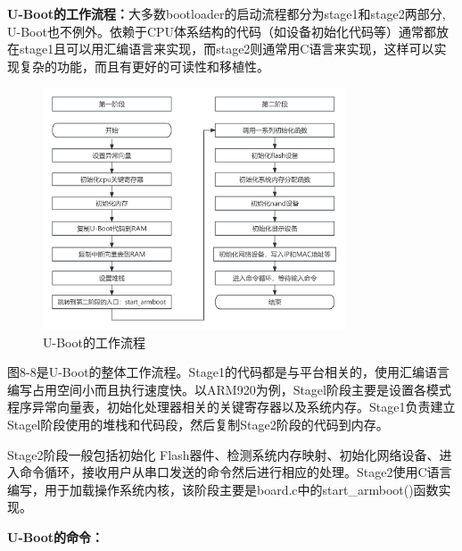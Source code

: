     \textbf{  U-Boot的工作流程：}大多数bootloader的启动流程都分为stage1和stage2两部分, U-Boot也不例外。依赖于CPU体系结构的代码（如设备初始化代码等）通常都放在stage1且可以用汇编语言来实现，而stage2则通常用C语言来实现，这样可以实现复杂的功能，而且有更好的可读性和移植性。
    
    \begin{figure}[h]
    	\centering
    	\includegraphics[width=0.8\textwidth]{figures/08-01-U-Boot的工作流程.png}
    	\caption{U-Boot的工作流程}
    	\label{U-Boot的工作流程}
    \end{figure}
    
    图8-8是U-Boot的整体工作流程。Stage1的代码都是与平台相关的，使用汇编语言编写占用空间小而且执行速度快。以ARM920为例，Stagel阶段主要是设置各模式程序异常向量表，初始化处理器相关的关键寄存器以及系统内存。Stage1负责建立Stagel阶段使用的堆栈和代码段，然后复制Stage2阶段的代码到内存。
    
    Stage2阶段一般包括初始化 Flash器件、检测系统内存映射、初始化网络设备、进入命令循环，接收用户从串口发送的命令然后进行相应的处理。Stage2使用C语言编写，用于加载操作系统内核，该阶段主要是board.c中的start\_armboot()函数实现。
    
    \textbf{ U-Boot的命令：}
    
